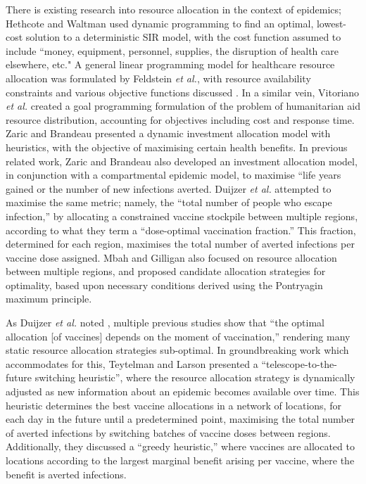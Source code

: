 \documentclass[10pt,letterpaper]{article}
\begin{document}
There is existing research into resource allocation in the context of epidemics; Hethcote and Waltman \cite{hethcote1973optimal} used dynamic programming to find an optimal, lowest-cost solution to a deterministic SIR model, with the cost function assumed to include ``money, equipment, personnel, supplies, the disruption of health care elsewhere, etc." A general linear programming model for healthcare resource allocation was formulated by Feldstein \textit{et al.}, with resource availability constraints and various objective functions discussed \cite{feldstein_1973}.
In a similar vein, Vitoriano \textit{et al.} \cite{vitoriano2011multi} created a goal programming formulation of the problem of humanitarian aid resource distribution, accounting for objectives including cost and response time. Zaric and Brandeau \cite{zaric_2002} presented a dynamic investment allocation model with heuristics, with the objective of maximising certain health benefits. In previous related work, Zaric and Brandeau \cite{zaric2001resource} also developed an investment allocation model, in conjunction with a compartmental epidemic model, to maximise ``life years gained or the number of new infections averted. Duijzer \textit{et al.} \cite{duijzer2018dose} attempted to maximise the same metric; namely, the ``total number of people who escape infection,'' by allocating a constrained vaccine stockpile between multiple regions, according to what they term a ``dose-optimal vaccination fraction.'' This fraction, determined for each region, maximises the total number of averted infections per vaccine dose assigned. Mbah and Gilligan \cite{mbah2011resource} also focused on resource allocation between multiple regions, and proposed candidate allocation strategies for optimality, based upon necessary conditions derived using the Pontryagin maximum principle. 

As Duijzer \textit{et al.} noted \cite{duijzer2018dose}, multiple previous studies \cite{mylius2008optimal, medlock2009optimizing, matrajt2010optimizing, matrajt2013optimal} show that ``the optimal allocation [of vaccines] depends on the moment of vaccination,'' rendering many static resource allocation strategies sub-optimal. In groundbreaking work which accommodates for this, Teytelman and Larson \cite{teytelman2013multiregional} presented a ``telescope-to-the-future switching heuristic'', where the resource allocation strategy is dynamically adjusted as new information about an epidemic becomes available over time. This heuristic determines the best vaccine allocations in a network of locations, for each day in the future until a predetermined point, maximising the total number of averted infections by switching batches of vaccine doses between regions. Additionally, they discussed a ``greedy heuristic,'' where vaccines are allocated to locations according to the largest marginal benefit arising per vaccine, where the benefit is averted infections.
\end{document}
